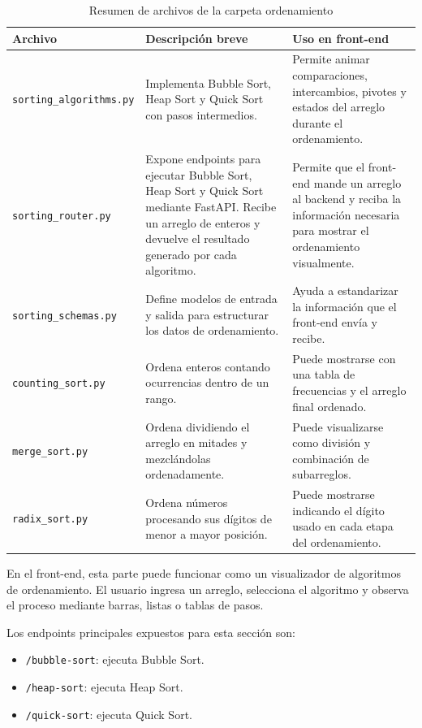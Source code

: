 \documentclass[12pt]{article}
\begin{document}
\begin{table}[H]
	\centering
	\begin{tabular}{|p{5cm}|p{5cm}|p{5cm}|}
		\hline
		\textbf{Archivo} & \textbf{Descripción breve} & \textbf{Uso en front-end} \\
		\hline
		\texttt{sorting\_algorithms.py} & Implementa Bubble Sort, Heap Sort y Quick Sort con pasos intermedios. & Permite animar comparaciones, intercambios, pivotes y estados del arreglo durante el ordenamiento. \\
		\hline
		\texttt{sorting\_router.py} & Expone endpoints para ejecutar Bubble Sort, Heap Sort y Quick Sort mediante FastAPI. Recibe un arreglo de enteros y devuelve el resultado generado por cada algoritmo. & Permite que el front-end mande un arreglo al backend y reciba la información necesaria para mostrar el ordenamiento visualmente. \\
		\hline
		\texttt{sorting\_schemas.py} & Define modelos de entrada y salida para estructurar los datos de ordenamiento. & Ayuda a estandarizar la información que el front-end envía y recibe. \\
		\hline
		\texttt{counting\_sort.py} & Ordena enteros contando ocurrencias dentro de un rango. & Puede mostrarse con una tabla de frecuencias y el arreglo final ordenado. \\
		\hline
		\texttt{merge\_sort.py} & Ordena dividiendo el arreglo en mitades y mezclándolas ordenadamente. & Puede visualizarse como división y combinación de subarreglos. \\
		\hline
		\texttt{radix\_sort.py} & Ordena números procesando sus dígitos de menor a mayor posición. & Puede mostrarse indicando el dígito usado en cada etapa del ordenamiento. \\
		\hline
	\end{tabular}
	\caption{Resumen de archivos de la carpeta ordenamiento}
\end{table}

En el front-end, esta parte puede funcionar como un visualizador de algoritmos de ordenamiento. El usuario ingresa un arreglo, selecciona el algoritmo y observa el proceso mediante barras, listas o tablas de pasos.

Los endpoints principales expuestos para esta sección son:

\begin{itemize}
	\item \texttt{/bubble-sort}: ejecuta Bubble Sort.
	\item \texttt{/heap-sort}: ejecuta Heap Sort.
	\item \texttt{/quick-sort}: ejecuta Quick Sort.
\end{itemize}
\end{document}
